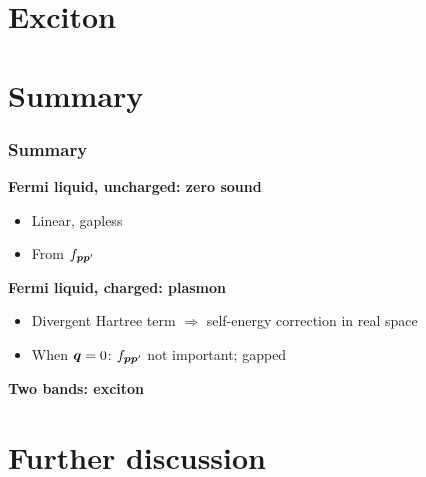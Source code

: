 \documentclass{beamer}
\begin{document}
\section{Exciton}

\section{Summary}

\begin{frame}
\frametitle{Summary}

\textbf{Fermi liquid, uncharged: zero sound} 
\begin{itemize}
    \item Linear, gapless 
    \item From $f_{\vb*{p} \vb*{p}'}$ 
\end{itemize}

\vspace{0.5cm}

\textbf{Fermi liquid, charged: plasmon} \begin{itemize}
    \item Divergent Hartree term $\Rightarrow$ self-energy correction in real space 
    \item When $\vb*{q} = 0$: $f_{\vb*{p} \vb*{p}'}$ not important; gapped
\end{itemize}

\vspace{0.5cm}

\textbf{Two bands: exciton} 

\end{frame}

\section{Further discussion}
\end{document}
